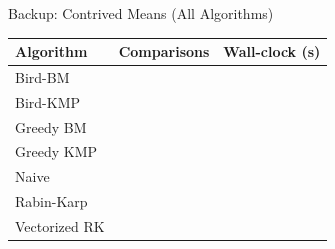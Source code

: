 \begin{frame}{Backup: Contrived Means (All Algorithms)}
\scriptsize
\centering
\begin{tabular}{lrr}
\toprule
\textbf{Algorithm} & \textbf{Comparisons} & \textbf{Wall-clock (s)} \\
\midrule
Bird-BM & \ContrivedCompBirdBM{} & \ContrivedTimeBirdBM{} \\
Bird-KMP & \ContrivedCompBirdKMP{} & \ContrivedTimeBirdKMP{} \\
Greedy BM & \ContrivedCompGreedyBM{} & \ContrivedTimeGreedyBM{} \\
Greedy KMP & \ContrivedCompGreedyKMP{} & \ContrivedTimeGreedyKMP{} \\
Naive & \ContrivedCompNaive{} & \ContrivedTimeNaive{} \\
Rabin-Karp & \ContrivedCompRabinKarp{} & \ContrivedTimeRabinKarp{} \\
Vectorized RK & \ContrivedCompVectorizedRK{} & \ContrivedTimeVectorizedRK{} \\
\bottomrule
\end{tabular}

\end{frame}
